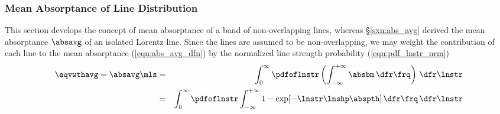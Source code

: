 \documentclass[12pt]{article}
\begin{document}
\subsubsection[Mean Absorptance of Line Distribution]{Mean Absorptance of Line Distribution}\label{sxn:mlk_abs}
This section develops the concept of mean absorptance of a band of
non-overlapping lines, whereas \S\ref{sxn:abs_avg} derived the mean
absorptance $\absavg$ of an isolated Lorentz line. 
Since the lines are assumed to be non-overlapping, we may weight
the contribution of each line to the mean absorptance
(\ref{eqn:abs_avg_dfn}) by the normalized line strength probability 
(\ref{eqn:pdf_lnstr_nrm}) 
\begin{eqnarray}
\eqvwthavg = \absavg \mls & = & 
\int_{0}^{\infty} \pdfoflnstr \left(
\int_{-\infty}^{+\infty} \absbm \,\dfr\frq 
\right) \,\dfr\lnstr \nonumber \\
& = & 
\int_{0}^{\infty} \pdfoflnstr
\int_{-\infty}^{+\infty} 
1 - \exp[ - \lnstr \lnshp \abspth ]
\,\dfr\frq 
\,\dfr\lnstr
\label{eqn:abs_lndst_dfn}
\end{eqnarray}
\end{document}
